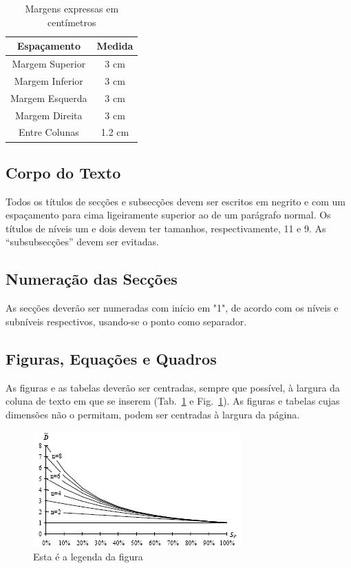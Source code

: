 \documentclass[9pt,a4paper]{extarticle}
\begin{document}
\begin{multicols}{2}
\begin{table}[H]
  \centering
  \caption{Margens expressas em centímetros}
\begin{tabular}{c | c}
	\hline
\textbf{Espaçamento} & \textbf{Medida}\\
	\hline
	\hline
        Margem Superior & 3 cm\\
        Margem Inferior & 3 cm\\
        Margem Esquerda & 3 cm\\
        Margem Direita  & 3 cm\\
        Entre Colunas   & 1.2 cm\\
	\hline
\end{tabular}
  \label{tab:medidas}
\end{table}

\subsection{Corpo do Texto}

Todos os títulos de secções e subsecções devem ser escritos em negrito e com um espaçamento para cima ligeiramente superior ao de um parágrafo normal.
Os títulos de níveis um e dois devem ter tamanhos, respectivamente, 11 e 9.
As ``subsubsecções'' devem ser evitadas.

\subsection{Numeração das Secções}

As secções deverão ser numeradas com início em "1", de acordo com os níveis e subníveis respectivos, usando-se o ponto como separador.

\subsection{Figuras, Equações e Quadros}

As figuras e as tabelas deverão ser centradas, sempre que possível, à largura da coluna de texto em que se
inserem (Tab.~\ref{tab:medidas} e Fig.~\ref{fig:figura}).
As figuras e tabelas cujas dimensões não o permitam, podem ser centradas à largura da página.

\begin{figure}[H]
\centerline{\includegraphics[scale=.6]{figura.png}}
\caption{Esta é a legenda da figura}
\label{fig:figura}
\end{figure}


\end{multicols}
\end{document}
